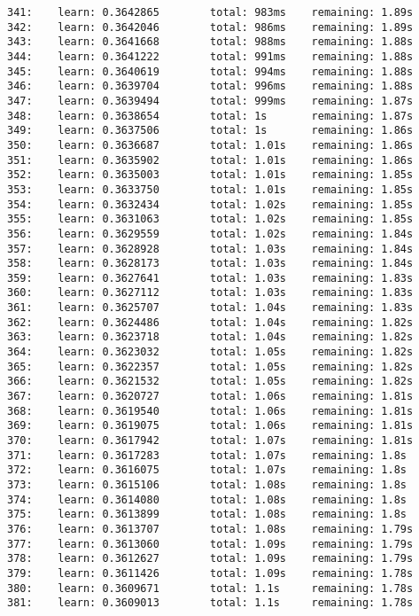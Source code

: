 \documentclass[11pt]{article}
\begin{document}
\begin{Verbatim}[commandchars=\\\{\}]
341:    learn: 0.3642865        total: 983ms    remaining: 1.89s
342:    learn: 0.3642046        total: 986ms    remaining: 1.89s
343:    learn: 0.3641668        total: 988ms    remaining: 1.88s
344:    learn: 0.3641222        total: 991ms    remaining: 1.88s
345:    learn: 0.3640619        total: 994ms    remaining: 1.88s
346:    learn: 0.3639704        total: 996ms    remaining: 1.88s
347:    learn: 0.3639494        total: 999ms    remaining: 1.87s
348:    learn: 0.3638654        total: 1s       remaining: 1.87s
349:    learn: 0.3637506        total: 1s       remaining: 1.86s
350:    learn: 0.3636687        total: 1.01s    remaining: 1.86s
351:    learn: 0.3635902        total: 1.01s    remaining: 1.86s
352:    learn: 0.3635003        total: 1.01s    remaining: 1.85s
353:    learn: 0.3633750        total: 1.01s    remaining: 1.85s
354:    learn: 0.3632434        total: 1.02s    remaining: 1.85s
355:    learn: 0.3631063        total: 1.02s    remaining: 1.85s
356:    learn: 0.3629559        total: 1.02s    remaining: 1.84s
357:    learn: 0.3628928        total: 1.03s    remaining: 1.84s
358:    learn: 0.3628173        total: 1.03s    remaining: 1.84s
359:    learn: 0.3627641        total: 1.03s    remaining: 1.83s
360:    learn: 0.3627112        total: 1.03s    remaining: 1.83s
361:    learn: 0.3625707        total: 1.04s    remaining: 1.83s
362:    learn: 0.3624486        total: 1.04s    remaining: 1.82s
363:    learn: 0.3623718        total: 1.04s    remaining: 1.82s
364:    learn: 0.3623032        total: 1.05s    remaining: 1.82s
365:    learn: 0.3622357        total: 1.05s    remaining: 1.82s
366:    learn: 0.3621532        total: 1.05s    remaining: 1.82s
367:    learn: 0.3620727        total: 1.06s    remaining: 1.81s
368:    learn: 0.3619540        total: 1.06s    remaining: 1.81s
369:    learn: 0.3619075        total: 1.06s    remaining: 1.81s
370:    learn: 0.3617942        total: 1.07s    remaining: 1.81s
371:    learn: 0.3617283        total: 1.07s    remaining: 1.8s
372:    learn: 0.3616075        total: 1.07s    remaining: 1.8s
373:    learn: 0.3615106        total: 1.08s    remaining: 1.8s
374:    learn: 0.3614080        total: 1.08s    remaining: 1.8s
375:    learn: 0.3613899        total: 1.08s    remaining: 1.8s
376:    learn: 0.3613707        total: 1.08s    remaining: 1.79s
377:    learn: 0.3613060        total: 1.09s    remaining: 1.79s
378:    learn: 0.3612627        total: 1.09s    remaining: 1.79s
379:    learn: 0.3611426        total: 1.09s    remaining: 1.78s
380:    learn: 0.3609671        total: 1.1s     remaining: 1.78s
381:    learn: 0.3609013        total: 1.1s     remaining: 1.78s

\end{Verbatim}
\end{document}
